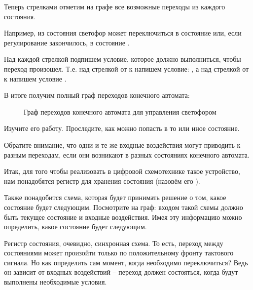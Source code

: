 \par{Теперь стрелками отметим на графе все возможные переходы из каждого состояния.}

\par{Например, из состояния  светофор может переключиться в состояние  или, если регулирование закончилось, в состояние .}

\par{Над каждой стрелкой подпишем условие, которое должно выполниться, чтобы переход произошел. Т.е. над стрелкой от  к  напишем условие: , а над стрелкой от  к  напишем условие .}

\par{В итоге получим полный граф переходов конечного автомата:}

\begin{figure}[H]
  \centering
  \def\svgwidth{\columnwidth}
  
  \caption{Граф переходов конечного автомата для управления светофором}
\end{figure}

\par{Изучите его работу. Проследите, как можно попасть в то или иное состояние.}

\par{Обратите внимание, что одни и те же входные воздействия могут приводить к разным переходам, если они возникают в разных состояниях конечного автомата.}

\par{Итак, для того чтобы реализовать в цифровой схемотехнике такое устройство, нам понадобятся регистр для хранения состояния (назовём его \textbf{}).}

\par{Также понадобится схема, которая будет принимать решение о том, какое состояние будет следующим. Посмотрите на граф: входом такой схемы должно быть текущее состояние и входные воздействия. Имея эту информацию можно определить, какое состояние будет следующим.}

\par{Регистр состояния, очевидно, синхронная схема. То есть, переход между состояниями может произойти только по положительному фронту тактового сигнала. Но как определить сам момент, когда необходимо переключиться? Ведь он зависит от входных воздействий – переход должен состояться, когда будут выполнены необходимые условия.}

